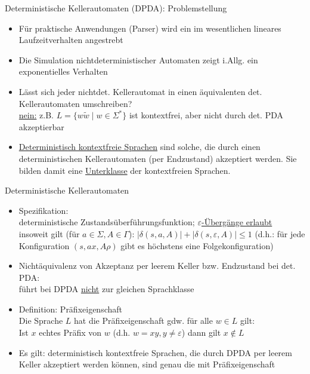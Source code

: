 \begin{frame}{Deterministische Kellerautomaten (DPDA): Problemstellung}
	\begin{itemize}
		\item Für praktische Anwendungen (Parser) wird ein im wesentlichen lineares Laufzeitverhalten angestrebt
		\item Die Simulation nichtdeterministischer Automaten zeigt i.Allg. ein exponentielles Verhalten
		\item Lässt sich jeder nichtdet. Kellerautomat in einen äquivalenten det. Kellerautomaten umschreiben?\\
		\underline{nein:} z.B. $L=\{w\tilde{w} \mid w\in \Sigma^*\}$ ist kontextfrei, aber nicht durch det. PDA akzeptierbar
		\item \underline{Deterministisch kontextfreie Sprachen} sind solche, die durch einen deterministischen Kellerautomaten (per Endzustand) akzeptiert werden. Sie bilden damit eine \underline{Unterklasse} der kontextfreien Sprachen.
	\end{itemize}
\end{frame}

\begin{frame}{Deterministische Kellerautomaten}
	\begin{itemize}
		\item Spezifikation:\\
		deterministische Zustandsüberführungsfunktion; \underline{$\varepsilon$-Übergänge erlaubt}\\
		insoweit gilt (für $a \in \Sigma, A \in \Gamma$): $|\delta(s, a, A)| + |\delta(s, \varepsilon, A)| \leq 1$ (d.h.: für	jede Konfiguration $(s, ax, A\rho)$ gibt es höchstens eine Folgekonfiguration)
		\item Nichtäquivalenz von Akzeptanz per leerem Keller bzw.
		Endzustand bei det. PDA:\\
		führt bei DPDA \underline{nicht} zur gleichen Sprachklasse
		\item Definition: Präfixeigenschaft\\
		Die Sprache $L$ hat die Präfixeigenschaft gdw. für alle $w \in L$ gilt:\\
		Ist $x$ echtes Präfix von $w$ (d.h. $w=xy, y \neq \varepsilon$) dann gilt $x \notin L$
		\item Es gilt: deterministisch kontextfreie Sprachen, die durch	DPDA per leerem Keller akzeptiert werden können, sind genau die mit Präfixeigenschaft
	\end{itemize}
\end{frame}

